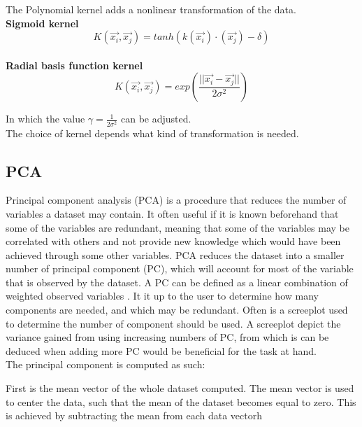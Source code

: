 The Polynomial kernel adds a nonlinear transformation of the data.
\\

\textbf{Sigmoid kernel}
\begin{equation}
K(\overrightarrow{x_i},\overrightarrow{x_j}) = tanh( k(\overrightarrow{x_i}) 
\cdot (\overrightarrow{x_j}) - \delta)
\end{equation}
\\

\textbf{Radial basis function kernel}
\begin{equation}
K(\overrightarrow{x_i},\overrightarrow{x_j}) =  
exp\left(\frac{||\overrightarrow{x_i} - 
\overrightarrow{x_j}||}{2\sigma^2}\right)
\end{equation}

In which the value $\gamma = \frac{1}{2\sigma^2}$ can be adjusted.\\


The choice of kernel depends what kind of transformation is needed. 
\subsection{PCA}
Principal component analysis (PCA) is a procedure that reduces the number of 
variables a dataset may contain.  It often useful if it is known beforehand that 
some of the variables are redundant, meaning that some of the variables may be 
correlated with others and not provide new knowledge which would have been 
achieved through some other variables.  PCA reduces the dataset into a smaller 
number of principal component (PC), which will account for most of the variable 
that is observed by the dataset. A PC can be defined as a linear combination of 
weighted observed variables . It it up to the user to determine how many 
components are needed, and which may be redundant. Often is a screeplot used to 
determine the number of component should be used. A screeplot depict the 
variance gained from using increasing numbers of PC, from which is can be 
deduced when adding more PC would be beneficial for the task at hand. \\

The principal component is computed as such: 

First is the mean vector of the whole dataset computed. 
The mean vector is used to center the data, such that the mean of the dataset 
becomes equal to zero. This is achieved by subtracting the mean from each data 
vectorh 

